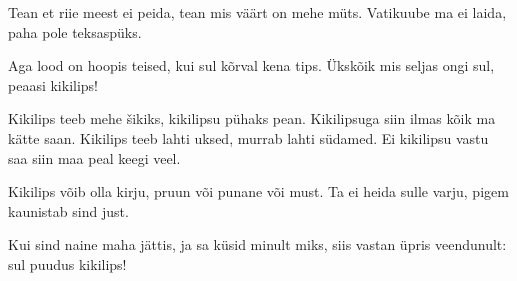 Tean et riie meest ei peida,
tean mis v\"a\"art on mehe m\"uts.
Vatikuube ma ei laida,
paha pole teksasp\"uks.

Aga lood on hoopis teised,
kui sul k\~orval kena tips.
\"Uksk\~oik mis seljas ongi sul,
peaasi kikilips!

Kikilips teeb mehe \v{s}ikiks,
kikilipsu p\"uhaks pean.
Kikilipsuga siin ilmas
k\~oik ma k\"atte saan.
Kikilips teeb lahti uksed,
murrab lahti s\"udamed.
Ei kikilipsu vastu saa
siin maa peal keegi veel.

Kikilips v\~oib olla kirju,
pruun v\~oi punane v\~oi must.
Ta ei heida sulle varju,
pigem kaunistab sind just.

Kui sind naine maha j\"attis,
ja sa k\"usid minult miks,
siis vastan \"upris veendunult:
sul puudus kikilips!